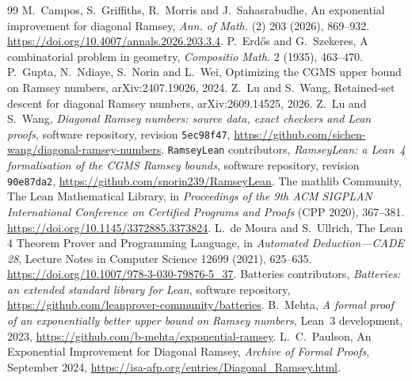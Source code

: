 \documentclass[11pt]{article}
\theoremstyle{definition}
\theoremstyle{remark}
\begin{document}
\begin{thebibliography}{99}
 M.~Campos, S.~Griffiths, R.~Morris and J.~Sahasrabudhe, An exponential improvement for diagonal Ramsey,
\emph{Ann. of Math.} (2) 203 (2026), 869--932.
\url{https://doi.org/10.4007/annals.2026.203.3.4}.
 P.~Erd\H{o}s and G.~Szekeres, A combinatorial problem in geometry, \emph{Compositio Math.} 2 (1935),
463--470.
 P.~Gupta, N.~Ndiaye, S.~Norin and L.~Wei, Optimizing the CGMS upper bound on Ramsey numbers,
arXiv:2407.19026, 2024.
 Z.~Lu and S.~Wang, Retained-set descent for diagonal Ramsey numbers, arXiv:2609.14525, 2026.
 Z.~Lu and S.~Wang, \emph{Diagonal Ramsey numbers: source data, exact checkers and Lean proofs},
software repository, revision \texttt{5ec98f47},
\url{https://github.com/sichen-wang/diagonal-ramsey-numbers}.
 \texttt{RamseyLean} contributors, \emph{RamseyLean: a Lean~4 formalisation of the CGMS
Ramsey bounds}, software repository, revision \texttt{90e87da2},
\url{https://github.com/snorin239/RamseyLean}.
 The mathlib Community, The Lean Mathematical Library, in \emph{Proceedings of the 9th ACM
SIGPLAN International Conference on Certified Programs and Proofs} (CPP 2020), 367--381.
\url{https://doi.org/10.1145/3372885.3373824}.
 L.~de Moura and S.~Ullrich, The Lean 4 Theorem Prover and Programming Language,
in \emph{Automated Deduction---CADE 28}, Lecture Notes in Computer Science 12699 (2021), 625--635.
\url{https://doi.org/10.1007/978-3-030-79876-5_37}.
 Batteries contributors, \emph{Batteries: an extended standard library for Lean},
software repository, \url{https://github.com/leanprover-community/batteries}.
 B.~Mehta, \emph{A formal proof of an exponentially better upper bound on Ramsey numbers},
Lean~3 development, 2023, \url{https://github.com/b-mehta/exponential-ramsey}.
 L.~C.~Paulson, An Exponential Improvement for Diagonal Ramsey,
\emph{Archive of Formal Proofs}, September 2024,
\url{https://isa-afp.org/entries/Diagonal_Ramsey.html}.
\end{thebibliography}
\end{document}
